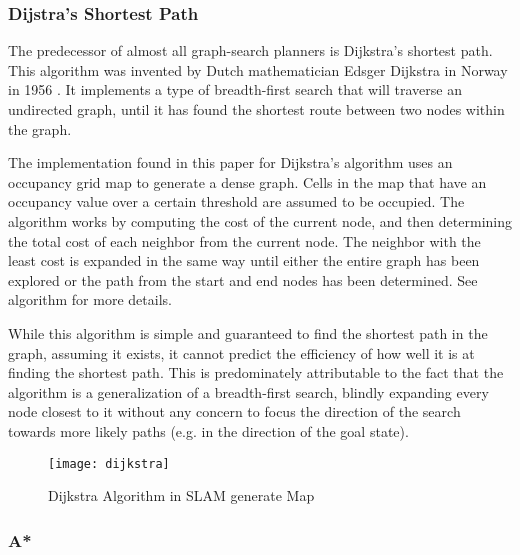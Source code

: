 \subsubsection{Dijstra's Shortest Path}
The predecessor of almost all graph-search planners is Dijkstra's shortest path. This algorithm was invented by Dutch mathematician Edsger Dijkstra in Norway in 1956 \cite{dijkstra1959note}. It implements a type of breadth-first search that will traverse an undirected graph, until it has found the shortest route between two nodes within the graph. 

The implementation found in this paper for Dijkstra's algorithm uses an occupancy grid map to generate a dense graph. Cells in the map that have an occupancy value over a certain threshold are assumed to be occupied. The algorithm works by computing the cost of the current node, and then determining the total cost of each neighbor from the current node. The neighbor with the least cost is expanded in the same way until either the entire graph has been explored or the path from the start and end nodes has been determined. See algorithm for more details.



While this algorithm is simple and guaranteed to find the shortest path in the graph, assuming it exists, it cannot predict the efficiency of how well it is at finding the shortest path. This is predominately attributable to the fact that the algorithm is a generalization of a breadth-first search, blindly expanding every node closest to it without any concern to focus the direction of the search towards more likely paths (e.g. in the direction of the goal state).






\begin{figure}[h]
    \texttt{[image: dijkstra]}
    \centering
    \label{fig:Dijkstra}
    \caption{Dijkstra Algorithm in SLAM generate Map}
\end{figure}


\subsubsection{A*}

